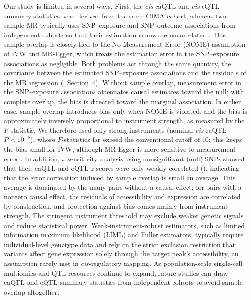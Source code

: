 \noindent Our study is limited in several ways. First, the \textit{cis}-caQTL and \textit{cis}-eQTL summary statistics were derived from the same CIMA cohort, whereas two-sample MR typically uses SNP--exposure and SNP--outcome associations from independent cohorts so that their estimation errors are uncorrelated \cite{burgess2016overlap}. This sample overlap is closely tied to the No Measurement Error (NOME) assumption of IVW and MR-Egger, which treats the estimation error in the SNP--exposure associations as negligible. Both problems act through the same quantity, the covariance between the estimated SNP--exposure associations and the residuals of the MR regression (, Section~4). Without sample overlap, measurement error in the SNP--exposure associations attenuates causal estimates toward the null; with complete overlap, the bias is directed toward the marginal association. In either case, sample overlap introduces bias only when NOME is violated, and the bias is approximately inversely proportional to instrument strength, as measured by the $F$-statistic. We therefore used only strong instruments (nominal \textit{cis}-caQTL $P<10^{-8}$), whose $F$-statistics far exceed the conventional cutoff of 10; this keeps the bias small for IVW, although MR-Egger is more sensitive to measurement error \cite{bowden2016nome}. In addition, a sensitivity analysis using nonsignificant (null) SNPs showed that their caQTL and eQTL $z$-scores were only weakly correlated (), indicating that the error correlation induced by sample overlap is small on average. This average is dominated by the many pairs without a causal effect; for pairs with a nonzero causal effect, the residuals of accessibility and expression are correlated by construction, and protection against bias comes mainly from instrument strength. The stringent instrument threshold may exclude weaker genetic signals and reduce statistical power. Weak-instrument-robust estimators, such as limited information maximum likelihood (LIML) and Fuller estimators, typically require individual-level genotype data and rely on the strict exclusion restriction that variants affect gene expression solely through the target peak's accessibility, an assumption rarely met in \textit{cis}-regulatory mapping. As population-scale single-cell multiomics and QTL resources continue to expand, future studies can draw caQTL and eQTL summary statistics from independent cohorts to avoid sample overlap altogether.
